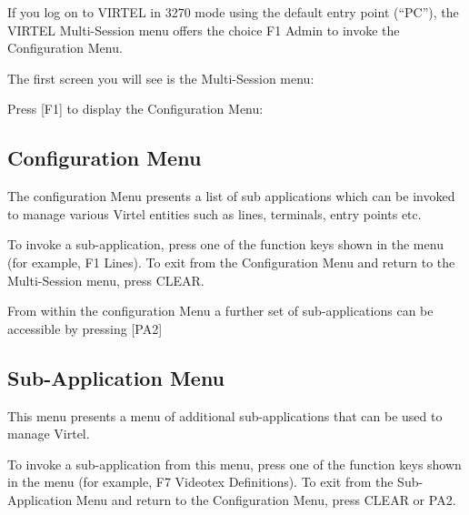 \documentclass[letterpaper,10pt,english]{sphinxmanual}
\begin{document}
If you log on to VIRTEL in 3270 mode using the default entry point (“PC”), the VIRTEL Multi-Session menu offers the choice F1 \textendash{} Admin to invoke the Configuration Menu.

The first screen you will see is the Multi-Session menu:


Press {[}F1{]} to display the Configuration Menu:

\newpage


\subsection{Configuration Menu}
\label{\detokenize{connectivity_guide:configuration-menu}}\label{\detokenize{connectivity_guide:index-1}}
The configuration Menu presents a list of sub applications which can be invoked to manage various Virtel entities such as lines, terminals, entry points etc.


To invoke a sub-application, press one of the function keys shown in the menu (for example, F1 \textendash{} Lines). To exit from the Configuration Menu and return to the Multi-Session menu, press CLEAR.

From within the configuration Menu a further set of sub-applications can be accessible by pressing {[}PA2{]}

\newpage


\subsection{Sub-Application Menu}
\label{\detokenize{connectivity_guide:sub-application-menu}}\label{\detokenize{connectivity_guide:index-2}}
This menu presents a menu of additional sub-applications that can be used to manage Virtel.


To invoke a sub-application from this menu, press one of the function keys shown in the menu (for example, F7 \textendash{} Videotex Definitions). To exit from the Sub-Application Menu and return to the Configuration Menu, press CLEAR or PA2.
\end{document}
